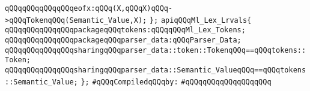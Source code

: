\verb|qQQqqQQqqQQqqQQqeofx:qQQq(X,qQQqX)qQQq->qQQqTokenqQQq(Semantic_Value,X);|\newline
\verb|};|\newline
\verb|apiqQQqMl_Lex_Lrvals{|\newline
\verb|qQQqqQQqqQQqqQQqpackageqQQqtokens:qQQqqQQqMl_Lex_Tokens;|\newline
\verb|qQQqqQQqqQQqqQQqpackageqQQqparser_data:qQQqParser_Data;|\newline
\verb|qQQqqQQqqQQqqQQqsharingqQQqparser_data::token::TokenqQQq==qQQqtokens::Token;|\newline
\verb|qQQqqQQqqQQqqQQqsharingqQQqparser_data::Semantic_ValueqQQq==qQQqtokens::Semantic_Value;|\newline
\verb|};|\newline
\newline
\verb|#qQQqCompiledqQQqby:|\newline
\verb|#qQQqqQQqqQQqqQQqqQQq|\newline
\newline

